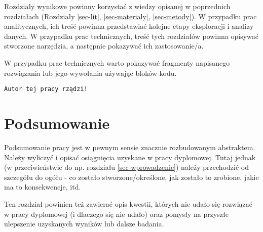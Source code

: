 \documentclass{amuthesis}
\begin{document}
Rozdziały wynikowe powinny korzystać z wiedzy opisanej w poprzednich
rozdziałach (Rozdziały \ref{sec-lit}, \ref{sec-materialy},
\ref{sec-metody}). W przypadku prac analitycznych, ich treść powinna
przedstawiać kolejne etapy eksploracji i analizy danych. W przypadku
prac technicznych, treść tych rozdziałów powinna opisywać stworzone
narzędzia, a następnie pokazywać ich zastosowanie/a.

W przypadku prac technicznych warto pokazywać fragmenty napisanego
rozwiązania lub jego wywołania używając bloków kodu.

\begin{Shaded}
\begin{Highlighting}[]
\OtherTok{=} 
  \NormalTok{)}
\NormalTok{\}}
\NormalTok{(}\NormalTok{)}
\end{Highlighting}
\end{Shaded}

\begin{verbatim}
Autor tej pracy rządzi!
\end{verbatim}


\hypertarget{podsumowanie}{%
\chapter{Podsumowanie}\label{podsumowanie}}

Podsumowanie pracy jest w pewnym sensie znacznie rozbudowanym
abstraktem. Należy wyliczyć i opisać osiągnięcia uzyskane w pracy
dyplomowej. Tutaj jednak (w przeciwieństwie do np. rozdziału
\ref{sec-wprowadzenie}) należy przechodzić od szczegółu do ogółu - co
zostało stworzone/określone, jak zostało to zrobione, jakie ma to
konsekwencje, itd.

Ten rozdział powinien też zawierać opis kwestii, których nie udało się
rozwiązać w pracy dyplomowej (i dlaczego się nie udało) oraz pomysły na
przyszłe ulepszenie uzyskanych wyników lub dalsze badania.

\printbibliography[heading=bibintoc, title=Bibliografia]
\end{document}
